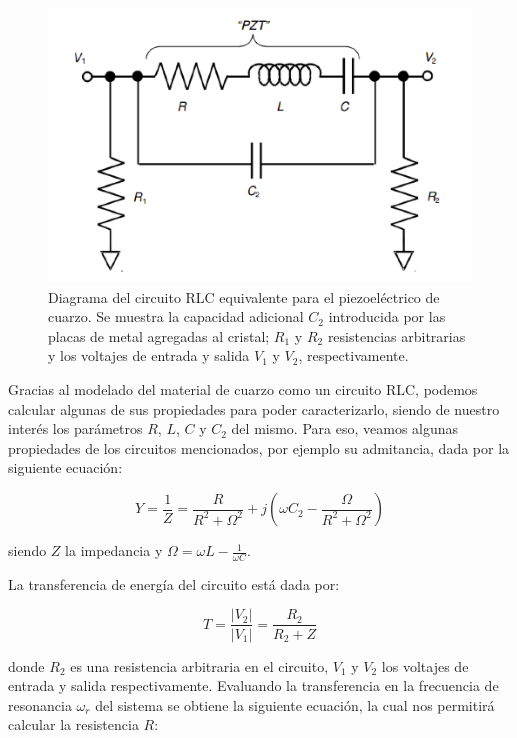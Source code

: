 \documentclass[twoside,twocolumn,a4paper]{article}
\begin{document}
\begin{figure}[H]
\includegraphics[width=\linewidth]{esquemapzt.jpg}
\caption{Diagrama del circuito RLC equivalente para el piezoel\'ectrico de cuarzo. Se muestra la capacidad adicional $C_{2}$ introducida por las placas de metal agregadas al cristal; $R_{1}$ y $R_{2}$ resistencias arbitrarias y los voltajes de entrada y salida $V_{1}$ y $V_{2}$, respectivamente.}
\label{fig:esquemapzt}
\end{figure}

Gracias al modelado del material de cuarzo como un circuito RLC, podemos calcular algunas de sus propiedades para poder caracterizarlo, siendo de nuestro inter\'es los par\'ametros $R$, $L$, $C$ y $C_{2}$ del mismo. Para eso, veamos algunas propiedades de los circuitos mencionados, por ejemplo su admitancia, dada por la siguiente ecuaci\'on\cite{eq:props}:

\begin{equation}
\label{eq:admitancia}
Y = \frac{1}{Z} = \frac{R}{R^{2} + \Omega^{2}} + j(\omega C_{2} - \frac{\Omega}{R^{2} + \Omega^{2}})
\end{equation}

siendo $Z$ la impedancia y $\Omega = \omega L - \frac{1}{\omega C}$.

La transferencia de energ\'ia del circuito est\'a dada por: 

\begin{equation}
\label{eq:transferencia}
T = \frac{|V_{2}|}{|V_{1}|} = \frac{R_{2}}{R_{2} + Z}
\end{equation}

donde $R_{2}$ es una resistencia arbitraria en el circuito, $V_{1}$ y $V_{2}$ los voltajes de entrada y salida respectivamente.
Evaluando la transferencia en la frecuencia de resonancia $\omega_{r}$ del sistema se obtiene la siguiente ecuaci\'on, la cual nos permitir\'a calcular la resistencia $R$:
\end{document}
